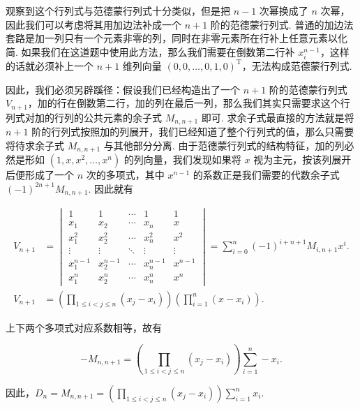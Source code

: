 \begin{solution}
    观察到这个行列式与范德蒙行列式十分类似，但是把 $n-1$ 次幂换成了 $n$ 次幂，因此我们可以考虑将其用加边法补成一个 $n+1$ 阶的范德蒙行列式. 普通的加边法套路是加一列只有一个元素非零的列，同时在非零元素所在行补上任意元素以化简. 如果我们在这道题中使用此方法，那么我们需要在倒数第二行补 $x_i^{n-1}$，这样的话就必须补上一个 $n+1$ 维列向量 $(0, 0, \ldots, 0, 1, 0)^{\mathrm{T}}$，无法构成范德蒙行列式.

    \vspace{0.5em}

    因此，我们必须另辟蹊径：假设我们已经构造出了一个 $n+1$ 阶的范德蒙行列式 $V_{n+1}$，加的行在倒数第二行，加的列在最后一列，那么我们其实只需要求这个行列式对加的行列的公共元素的余子式 $M_{n,n+1}$ 即可. 求余子式最直接的方法就是将 $n+1$ 阶的行列式按照加的列展开，我们已经知道了整个行列式的值，那么只需要将待求余子式 $M_{n,n+1}$ 与其他部分分离. 由于范德蒙行列式的结构特征，加的列必然是形如 $(1, x, x^2, \ldots, x^n)$ 的列向量，我们发现如果将 $x$ 视为主元，按该列展开后便形成了一个 $n$ 次的多项式，其中 $x^{n-1}$ 的系数正是我们需要的代数余子式 $(-1)^{2n+1} M_{n,n+1}$. 因此就有

    \begin{align*}
        V_{n+1} &= \begin{vmatrix}
            1      & 1      & \cdots & 1      & 1      \\
            x_1    & x_2    & \cdots & x_n    & x      \\
            x_1^2  & x_2^2  & \cdots & x_n^2  & x^2    \\
            \vdots & \vdots & \ddots & \vdots & \vdots \\
            x_1^{n-1} & x_2^{n-1} & \cdots & x_n^{n-1} & x^{n-1} \\
            x_1^n  & x_2^n  & \cdots & x_n^n  & x^n
        \end{vmatrix} = \sum\limits_{i=0}^n (-1)^{i+n+1} M_{i, n+1} x^i. \\
        V_{n+1} &= \left( \prod\limits_{1 \leqslant i < j \leqslant n} (x_j - x_i) \right) \left(\prod\limits_{i=1}^n (x - x_i) \right).
    \end{align*}

    上下两个多项式对应系数相等，故有

    \[
        - M_{n,n+1} = \left( \prod\limits_{1 \leqslant i < j \leqslant n} (x_j - x_i) \right) \sum\limits_{i=1}^n -x_i.
    \]

    因此，$D_n = M_{n, n+1} = \left( \displaystyle\prod_{1 \leqslant i < j \leqslant n} (x_j - x_i) \right) \displaystyle\sum_{i=1}^n x_i$.
\end{solution}

